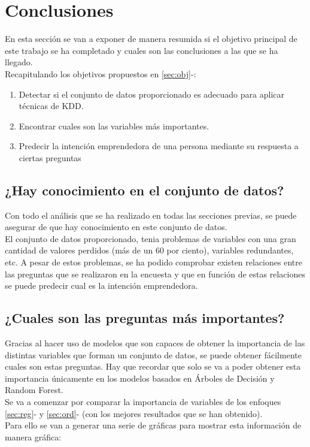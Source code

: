 \chapter{Conclusiones}
\label{sec:conclusiones}
En esta sección se van a exponer de manera resumida si el objetivo principal de este trabajo se ha completado y cuales son las conclusiones a las que se ha llegado.\\
\linebreak
Recapitulando los objetivos propuestos en \ref{sec:obj}-:
\begin{enumerate}[1.]
	\item Detectar si el conjunto de datos proporcionado es adecuado para aplicar técnicas de KDD.
	\item Encontrar cuales son las variables más importantes.
	\item Predecir la intención emprendedora de una persona mediante su respuesta a ciertas preguntas
\end{enumerate}
\section{¿Hay conocimiento en el conjunto de datos?}
Con todo el análisis que se ha realizado en todas las secciones previas, se puede asegurar de que hay conocimiento en este conjunto de datos.\\
El conjunto de datos proporcionado, tenia problemas de variables con una gran cantidad de valores perdidos (más de un 60 por ciento), variables redundantes, etc. A pesar de estos problemas, se ha podido comprobar existen relaciones entre las preguntas que se realizaron en la encuesta y que en función de estas relaciones se puede predecir cual es la intención emprendedora.
\section{¿Cuales son las preguntas más importantes?}
Gracias al hacer uso de modelos que son capaces de obtener la importancia de las distintas variables que forman un conjunto de datos, se puede obtener fácilmente cuales son estas preguntas. Hay que recordar que solo se va a poder obtener esta importancia únicamente en los modelos basados en Árboles de Decisión y Random Forest.\\
\linebreak
Se va a comenzar por comparar la importancia de variables de los enfoques \ref{sec:reg}- y \ref{sec:ord}- (con los mejores resultados que se han obtenido).\\ 
Para ello se van a generar una serie de gráficas para mostrar esta información de manera gráfica:

